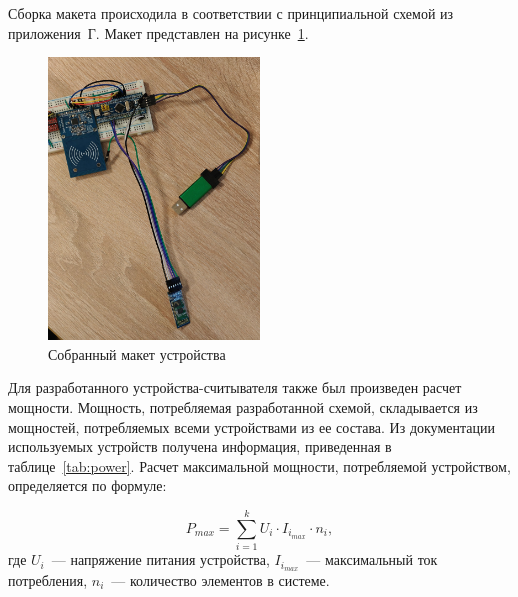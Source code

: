 Сборка макета происходила в соответствии с принципиальной схемой из приложения~Г.
Макет представлен на рисунке~\ref{fig:maket}.

\begin{figure}[H]
    \centering
    \includegraphics[width=0.5\textwidth]{images/design/maket}
    \caption{\centering Собранный макет устройства}
    \label{fig:maket}
\end{figure}

Для разработанного устройства-считывателя также был произведен расчет мощности.
Мощность, потребляемая разработанной схемой, складывается из мощностей, потребляемых всеми устройствами из ее состава.
Из документации используемых устройств получена информация, приведенная в таблице~\ref{tab:power}.
Расчет максимальной мощности, потребляемой устройством, определяется по формуле:

$$
P_{max} = \sum_{i=1}^{k} U_i \cdot I_{i_{max}} \cdot n_i,
$$
где $U_i$~--- напряжение питания устройства, $I_{i_{max}}$~--- максимальный ток потребления, $n_i$~--- количество элементов в системе.


